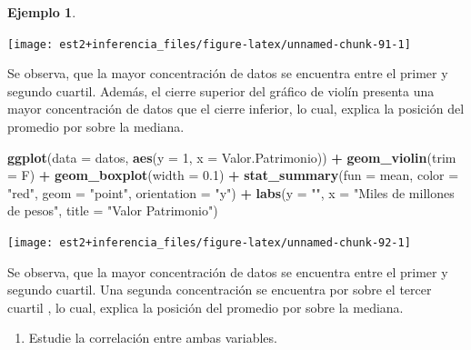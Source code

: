 \documentclass[
  11pt,
]{book}
\newenvironment{Shaded}{\begin{snugshade}}{\end{snugshade}}
\newcommand{\AttributeTok}[1]{\textcolor[rgb]{0.13,0.29,0.53}{#1}}
\newcommand{\DecValTok}[1]{\textcolor[rgb]{0.00,0.00,0.81}{#1}}
\newcommand{\FloatTok}[1]{\textcolor[rgb]{0.00,0.00,0.81}{#1}}
\newcommand{\FunctionTok}[1]{\textcolor[rgb]{0.13,0.29,0.53}{\textbf{#1}}}
\newcommand{\NormalTok}[1]{#1}
\newcommand{\SpecialCharTok}[1]{\textcolor[rgb]{0.81,0.36,0.00}{\textbf{#1}}}
\newcommand{\StringTok}[1]{\textcolor[rgb]{0.31,0.60,0.02}{#1}}
\providecommand{\tightlist}{%
  \setlength{\itemsep}{0pt}\setlength{\parskip}{0pt}}
\theoremstyle{definition}
\theoremstyle{definition}
\newtheorem{example}{Ejemplo}[chapter]
\theoremstyle{definition}
\theoremstyle{definition}
\theoremstyle{remark}
\begin{document}
\begin{example}
\begin{center}\texttt{[image: est2+inferencia\_files/figure-latex/unnamed-chunk-91-1]} \end{center}

Se observa, que la mayor concentración de datos se encuentra entre el primer y segundo cuartil. Además, el cierre superior del gráfico de violín presenta una mayor concentración de datos que el cierre inferior, lo cual, explica la posición del promedio por sobre la mediana.

\begin{Shaded}
\begin{Highlighting}[]
\FunctionTok{ggplot}\NormalTok{(}\AttributeTok{data =}\NormalTok{ datos, }\FunctionTok{aes}\NormalTok{(}\AttributeTok{y =} \DecValTok{1}\NormalTok{, }\AttributeTok{x =}\NormalTok{ Valor.Patrimonio)) }\SpecialCharTok{+} 
  \FunctionTok{geom\_violin}\NormalTok{(}\AttributeTok{trim =}\NormalTok{ F) }\SpecialCharTok{+}
  \FunctionTok{geom\_boxplot}\NormalTok{(}\AttributeTok{width =} \FloatTok{0.1}\NormalTok{) }\SpecialCharTok{+}
\FunctionTok{stat\_summary}\NormalTok{(}\AttributeTok{fun =}\NormalTok{ mean, }\AttributeTok{color =} \StringTok{"red"}\NormalTok{, }\AttributeTok{geom =} \StringTok{"point"}\NormalTok{, }\AttributeTok{orientation =} \StringTok{"y"}\NormalTok{) }\SpecialCharTok{+}
  \FunctionTok{labs}\NormalTok{(}\AttributeTok{y =} \StringTok{""}\NormalTok{, }\AttributeTok{x =} \StringTok{"Miles de millones de pesos"}\NormalTok{, }\AttributeTok{title =} \StringTok{"Valor Patrimonio"}\NormalTok{)}
\end{Highlighting}
\end{Shaded}

\begin{center}\texttt{[image: est2+inferencia\_files/figure-latex/unnamed-chunk-92-1]} \end{center}

Se observa, que la mayor concentración de datos se encuentra entre el primer y segundo cuartil. Una segunda concentración se encuentra por sobre el tercer cuartil , lo cual, explica la posición del promedio por sobre la mediana.

\begin{enumerate}
\def\labelenumi{\arabic{enumi}.}
\setcounter{enumi}{1}
\tightlist
\item
  Estudie la correlación entre ambas variables.
\end{enumerate}

\begin{Shaded}
\end{Shaded}


\end{example}
\end{document}
